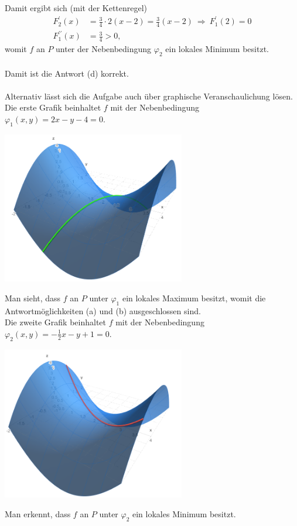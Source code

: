 Damit ergibt sich (mit der Kettenregel)
\begin{align*}
	F_2^\prime(x) &= \frac{3}{4} \cdot 2 (x -2 ) = \frac{3}{4} (x-2) \ \Rightarrow \ F_1^\prime(2) = 0\\
	F_1^{\prime \prime}(x) &= \frac{3}{4} > 0,
\end{align*}
womit $ f $ an $ P $ unter der Nebenbedingung $ \varphi_2 $ ein lokales Minimum besitzt.\\
\\
Damit ist die Antwort (d) korrekt.\\
\\
Alternativ lässt sich die Aufgabe auch über graphische Veranschaulichung lösen.
Die erste Grafik beinhaltet $ f $ mit der Nebenbedingung $\varphi_1(x,y) = 2x -y -4 = 0$.
\begin{center}
	\includegraphics[width=0.6\textwidth]{pictures/aufgabe2_1_1}
\end{center}
Man sieht, dass $ f $ an $ P $ unter $ \varphi_1 $ ein lokales Maximum besitzt, womit die Antwortmöglichkeiten (a) und (b) ausgeschlossen sind.\\
Die zweite Grafik beinhaltet $ f $ mit der Nebenbedingung $\varphi_2(x,y) = -\frac{1}{2}x -y +1 = 0$.
\begin{center}
	\includegraphics[width=0.6\textwidth]{pictures/aufgabe2_1_2}
\end{center}
Man erkennt, dass $ f $ an $ P $ unter $ \varphi_2 $ ein lokales Minimum besitzt.
\newpage

